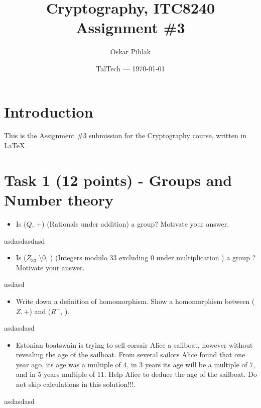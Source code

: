 \documentclass{article}
\title{Cryptography, ITC8240 Assignment \#3} %
\author{Oskar Pihlak} %
\date{TalTech --- \today} %
\begin{document}
\maketitle %


\section*{Introduction} %

This is the Assignment \#3 submission for the Cryptography course, written in LaTeX.\\




\section*{Task 1 (12 points) - Groups and Number theory} %
\begin{itemize}
    \item Is ($Q$, $+$) (Rationals under addition) a group? Motivate your answer.
\end{itemize}
asdasdasdasd

\begin{itemize}
    \item Is ($Z_{33}$ \textbackslash {0}, \text{*}) (Integers modulo $33$ excluding $0$ under multiplication ) a group ? Motivate your answer.
\end{itemize}
asdasd

\begin{itemize}
    \item Write down a definition of homomorphism. Show a homomorphism
    between ($Z, +$) and ($R^+$, \text{*}).
\end{itemize}
asdasdasd

\begin{itemize}
    \item Estonian boatswain is trying to sell corsair Alice a sailboat, however without revealing the age of the sailboat. 
    From several sailors Alice found that one year ago, its age was a multiple of $4$, in $3$ years its age will be a multiple of $7$, 
    and in $5$ years multiple of $11$. Help Alice to deduce the age of the sailboat. Do not skip calculations in this solution!!!.
\end{itemize}
asdasdasd
\end{document}
